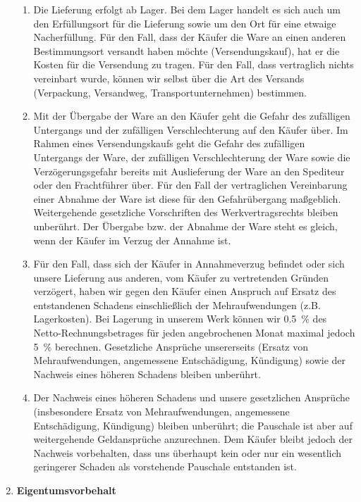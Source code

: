 \documentclass[%
    a4paper,%
    10pt,
]{scrartcl}
\begin{document}
\begin{multicols}{2}
\begin{enumerate}
        \begin{enumerate}
          \item Die Lieferung erfolgt ab Lager. Bei dem Lager handelt es sich auch um den Erfüllungsort für die Lieferung sowie um den Ort für eine etwaige Nacherfüllung. Für den Fall, dass der Käufer die Ware an einen anderen Bestimmungsort versandt haben möchte (Versendungskauf), hat er die Kosten für die Versendung zu tragen. Für den Fall, dass vertraglich nichts vereinbart wurde, können wir selbst über die Art des Versands (Verpackung, Versandweg, Transportunternehmen) bestimmen.
          \vfill\null
          \columnbreak
          \item Mit der Übergabe der Ware an den Käufer geht die Gefahr des zufälligen Untergangs und der zufälligen Verschlechterung auf den Käufer über. Im Rahmen eines Versendungskaufs geht die Gefahr des zufälligen Untergangs der Ware, der zufälligen Verschlechterung der Ware sowie die Verzögerungsgefahr bereits mit Auslieferung der Ware an den Spediteur oder den Frachtführer über. Für den Fall der vertraglichen Vereinbarung einer Abnahme der Ware ist diese für den Gefahrübergang maßgeblich. Weitergehende gesetzliche Vorschriften des Werkvertragsrechts bleiben unberührt. Der Übergabe bzw. der Abnahme der Ware steht es gleich, wenn der Käufer im Verzug der Annahme ist.
          \item Für den Fall, dass sich der Käufer in Annahmeverzug befindet oder sich unsere Lieferung aus anderen, vom Käufer zu vertretenden Gründen verzögert, haben wir gegen den Käufer einen Anspruch auf Ersatz des entstandenen Schadens einschließlich der Mehraufwendungen (z.B. Lagerkosten). Bei Lagerung in unserem Werk können wir \qty{0,5}{\percent} des Netto-Rechnungsbetrages für jeden angebrochenen Monat maximal jedoch \qty{5}{\percent} berechnen. Gesetzliche Ansprüche unsererseits (Ersatz von Mehraufwendungen, angemessene Entschädigung, Kündigung) sowie der Nachweis eines höheren Schadens bleiben unberührt.
          \item Der Nachweis eines höheren Schadens und unsere gesetzlichen Ansprüche (insbesondere Ersatz von Mehraufwendungen, angemessene Entschädigung, Kündigung) bleiben unberührt; die Pauschale ist aber auf weitergehende Geldansprüche anzurechnen. Dem Käufer bleibt jedoch der Nachweis vorbehalten, dass uns überhaupt kein oder nur ein wesentlich geringerer Schaden als vorstehende Pauschale entstanden ist.
        \end{enumerate}
        \item \textbf{Eigentumsvorbehalt}%

\end{enumerate}
\end{multicols}
\end{document}
